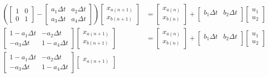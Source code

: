 \documentclass[11pt]{article}
\begin{document}
\begin{subequations}
\begin{align}
    \left(
    \begin{bmatrix}
      1 & 0 \\
      0 & 1
    \end{bmatrix} -
    \begin{bmatrix}
      a_1\Delta t & a_2\Delta t \\
      a_3\Delta t & a_4\Delta t
    \end{bmatrix}
    \right)
    \begin{bmatrix}
      x_{a(n+1)} \\
      x_{b(n+1)}
    \end{bmatrix} &=
    \begin{bmatrix}
      x_{a(n)} \\
      x_{b(n)}
    \end{bmatrix} +
    \begin{bmatrix}
      b_1\Delta t & b_2\Delta t \\
    \end{bmatrix}
    \begin{bmatrix}
      u_1 \\
      u_2
    \end{bmatrix} \\
    \begin{bmatrix}
      1 - a_1\Delta t & - a_2\Delta t \\
      - a_3\Delta t & 1 - a_4\Delta t
    \end{bmatrix}
    \begin{bmatrix}
      x_{a(n+1)} \\
      x_{b(n+1)}
    \end{bmatrix} &=
    \begin{bmatrix}
      x_{a(n)} \\
      x_{b(n)}
    \end{bmatrix} +
    \begin{bmatrix}
      b_1\Delta t & b_2\Delta t \\
    \end{bmatrix}
    \begin{bmatrix}
      u_1 \\
      u_2
    \end{bmatrix} \\
    \begin{bmatrix}
      1 - a_1\Delta t & - a_2\Delta t \\
      - a_3\Delta t & 1 - a_4\Delta t
    \end{bmatrix}
    \begin{bmatrix}
      x_{a(n+1)} \\

\end{bmatrix}
\end{align}
\end{subequations}
\end{document}

